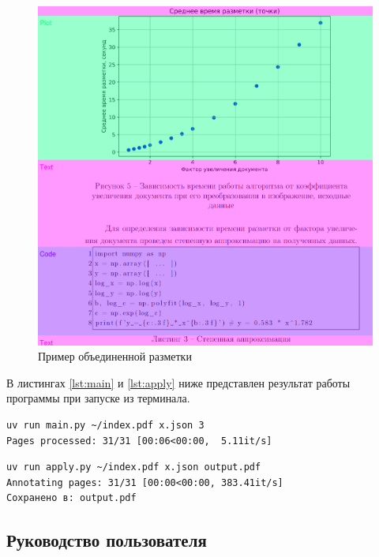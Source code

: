 \begin{figure}[H]
	\centering
	\includegraphics[width=\textwidth]{img/m.merged.png}
    \caption{Пример объединенной разметки}
	\label{fig:merged}
\end{figure}

\newpage

В листингах \ref{lst:main} и \ref{lst:apply} ниже представлен результат работы программы при запуске из терминала.

\begin{lstlisting}[caption={Запуск и результат работы разметки из терминала}, label={lst:main}]
uv run main.py ~/index.pdf x.json 3
Pages processed: 31/31 [00:06<00:00,  5.11it/s]
\end{lstlisting}

\begin{lstlisting}[caption={Запуск и результат применения разметки к PDF из терминала}, label={lst:apply}]
uv run apply.py ~/index.pdf x.json output.pdf
Annotating pages: 31/31 [00:00<00:00, 383.41it/s]
Сохранено в: output.pdf
\end{lstlisting}

\subsection{Руководство пользователя}

